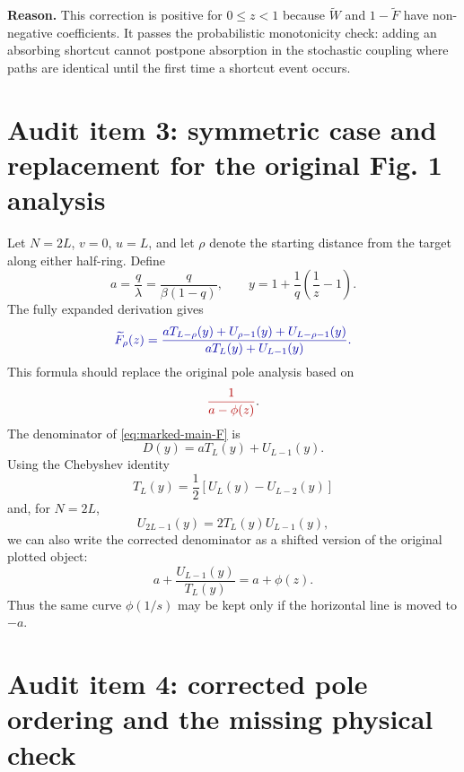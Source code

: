 \documentclass[11pt]{article}
\newcommand{\wt}{\widetilde}
\newcommand{\Original}[1]{\textcolor{red!70!black}{#1}}
\newcommand{\Corrected}[1]{\textcolor{blue!65!black}{#1}}
\newcommand{\Reason}[1]{\par\noindent\textbf{Reason.} #1\par\medskip}
\begin{document}
\Reason{This correction is positive for $0\leq z<1$ because $\wt W$ and $1-\wt F$ have
non-negative coefficients.  It passes the probabilistic monotonicity check: adding an absorbing
shortcut cannot postpone absorption in the stochastic coupling where paths are identical until the
first time a shortcut event occurs.}

\section{Audit item 3: symmetric case and replacement for the original Fig. 1 analysis}

Let $N=2L$, $v=0$, $u=L$, and let $\rho$ denote the starting distance from the target along either
half-ring.  Define
\begin{equation}
  a=\frac{q}{\lambda}=\frac{q}{\beta(1-q)},
  \qquad
  y=1+\frac{1}{q}\left(\frac1z-1\right).
\end{equation}
The fully expanded derivation gives
\begin{equation}
  \Corrected{
  \wt F_\rho(z)=
  \frac{aT_{L-\rho}(y)+U_{\rho-1}(y)+U_{L-\rho-1}(y)}
  {aT_L(y)+U_{L-1}(y)}.}
  \label{eq:marked-main-F}
\end{equation}
This formula should replace the original pole analysis based on
\begin{equation}
  \Original{\frac{1}{a-\phi(z)}}.
\end{equation}
The denominator of \eqref{eq:marked-main-F} is
\begin{equation}
  D(y)=aT_L(y)+U_{L-1}(y).
\end{equation}
Using the Chebyshev identity
\begin{equation}
  T_L(y)=\frac12\left[U_L(y)-U_{L-2}(y)\right]
\end{equation}
and, for $N=2L$,
\begin{equation}
  U_{2L-1}(y)=2T_L(y)U_{L-1}(y),
\end{equation}
we can also write the corrected denominator as a shifted version of the original plotted object:
\begin{equation}
  a+\frac{U_{L-1}(y)}{T_L(y)}=a+\phi(z).
\end{equation}
Thus the same curve $\phi(1/s)$ may be kept only if the horizontal line is moved to $-a$.

\section{Audit item 4: corrected pole ordering and the missing physical check}
\end{document}
